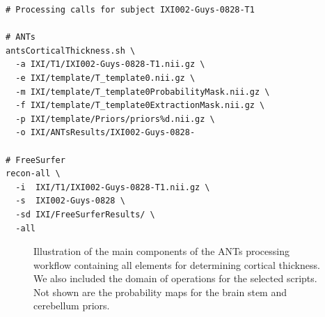 \begin{lstlisting}
# Processing calls for subject IXI002-Guys-0828-T1

# ANTs
antsCorticalThickness.sh \
  -a IXI/T1/IXI002-Guys-0828-T1.nii.gz \
  -e IXI/template/T_template0.nii.gz \
  -m IXI/template/T_template0ProbabilityMask.nii.gz \
  -f IXI/template/T_template0ExtractionMask.nii.gz \  
  -p IXI/template/Priors/priors%d.nii.gz \
  -o IXI/ANTsResults/IXI002-Guys-0828-

# FreeSurfer  
recon-all \
  -i  IXI/T1/IXI002-Guys-0828-T1.nii.gz \
  -s  IXI002-Guys-0828 \
  -sd IXI/FreeSurferResults/ \
  -all
\end{lstlisting}

\begin{figure}
  \centering
  \caption{\baselineskip 12pt Illustration of the main components of the ANTs processing 
  workflow containing all elements for determining cortical thickness. 
  We also included the domain of operations for the selected scripts.
  Not shown are the probability maps for the brain stem and cerebellum
  priors.}
  \label{fig:pipeline}
\end{figure}

